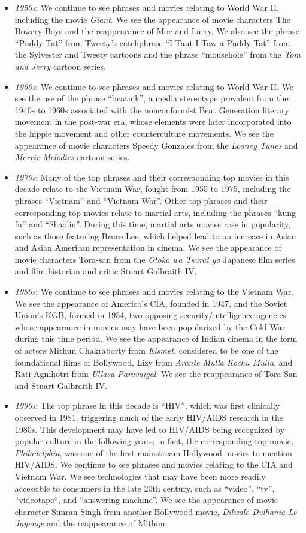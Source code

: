 \documentclass{article}
\begin{document}
\begin{multicols}{2}
\begin{itemize}
    \item \textit{1950s}: We continue to see phrases and movies relating to World War II, including the movie \textit{Giant}. We see the appearance of movie characters The Bowery Boys and the reappearance of Moe and Larry. We also see the phrase ``Puddy Tat'' from Tweety's catchphrase ``I Taut I Taw a Puddy-Tat'' from the Sylvester and Tweety cartoons and the phrase ``mousehole'' from the \textit{Tom and Jerry} cartoon series.
    \item \textit{1960s}: We continue to see phrases and movies relating to World War II. We see the use of the phrase ``beatnik'', a media stereotype prevalent from the 1940s to 1960s associated with the nonconformist Beat Generation literary movement in the post-war era, whose elements were later incorporated into the hippie movement and other counterculture movements. We see the appearance of movie characters Speedy Gonzales from the \textit{Looney Tunes} and \textit{Merrie Melodies} cartoon series.
    \item \textit{1970s}: Many of the top phrases and their corresponding top movies in this decade relate to the Vietnam War, fought from 1955 to 1975, including the phrases ``Vietnam'' and ``Vietnam War''. Other top phrases and their corresponding top movies relate to martial arts, including the phrases ``kung fu'' and ``Shaolin''. During this time, martial arts movies rose in popularity, such as those featuring Bruce Lee, which helped lead to an increase in Asian and Asian American representation in cinema. We see the appearance of movie characters Tora-san from the \textit{Otoko wa Tsurai yo} Japanese film series and film historian and critic Stuart Galbraith IV.
    \item \textit{1980s}: We continue to see phrases and movies relating to the Vietnam War. We see the appearance of America's CIA, founded in 1947, and the Soviet Union's KGB, formed in 1954, two opposing security/intelligence agencies whose appearance in movies may have been popularized by the Cold War during this time period. We see the appearance of Indian cinema in the form of actors Mithun Chakraborty from \textit{Kismet}, considered to be one of the foundational films of Bollywood, Lizy from \textit{Arante Mulla Kochu Mulla}, and Rati Agnihotri from \textit{Ullasa Paravaigal}. We see the reappearance of Tora-San and Stuart Galbraith IV.
    \item \textit{1990s}: The top phrase in this decade is ``HIV'', which was first clinically observed in 1981, triggering much of the early HIV/AIDS research in the 1980s. This development may have led to HIV/AIDS being recognized by popular culture in the following years; in fact, the corresponding top movie, \textit{Philadelphia}, was one of the first mainstream Hollywood movies to mention HIV/AIDS. We continue to see phrases and movies relating to the CIA and Vietnam War. We see technologies that may have been more readily accessible to consumers in the late 20th century, such as ``video'', ``tv'', ``videotape``, and ``answering machine''. We see the appearance of movie character Simran Singh from another Bollywood movie, \textit{Dilwale Dulhania Le Jayenge} and the reappearance of Mithun.

\end{itemize}
\end{multicols}
\end{document}
